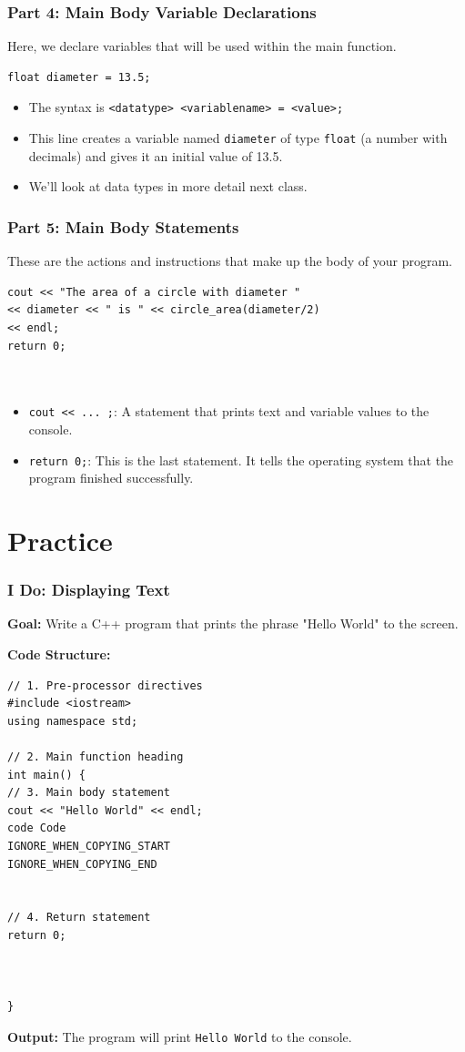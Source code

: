 \documentclass{beamer}
\begin{document}
\begin{frame}[fragile]
\frametitle{Part 4: Main Body Variable Declarations}
Here, we declare variables that will be used within the main function.
\begin{lstlisting}
float diameter = 13.5;
\end{lstlisting}
\begin{itemize}
\item The syntax is \texttt{<datatype> <variablename> = <value>;}
\item This line creates a variable named \texttt{diameter} of type \texttt{float} (a number with decimals) and gives it an initial value of 13.5.
\item We'll look at data types in more detail next class.
\end{itemize}
\end{frame}

\begin{frame}[fragile]
\frametitle{Part 5: Main Body Statements}
These are the actions and instructions that make up the body of your program.
\begin{lstlisting}
cout << "The area of a circle with diameter "
<< diameter << " is " << circle_area(diameter/2)
<< endl;
return 0;

  

\end{lstlisting}
\begin{itemize}
\item \texttt{cout << ... ;}: A statement that prints text and variable values to the console.
\item \texttt{return 0;}: This is the last statement. It tells the operating system that the program finished successfully.
\end{itemize}
\end{frame}

\section{Practice}

\begin{frame}[fragile]
\frametitle{I Do: Displaying Text}
\textbf{Goal:} Write a C++ program that prints the phrase "Hello World" to the screen.

\pause

\textbf{Code Structure:}
\begin{lstlisting}
// 1. Pre-processor directives
#include <iostream>
using namespace std;

// 2. Main function heading
int main() {
// 3. Main body statement
cout << "Hello World" << endl;
code Code
IGNORE_WHEN_COPYING_START
IGNORE_WHEN_COPYING_END

    
// 4. Return statement
return 0;

  

}
\end{lstlisting}
\textbf{Output:} The program will print \texttt{Hello World} to the console.
\end{frame}
\end{document}
